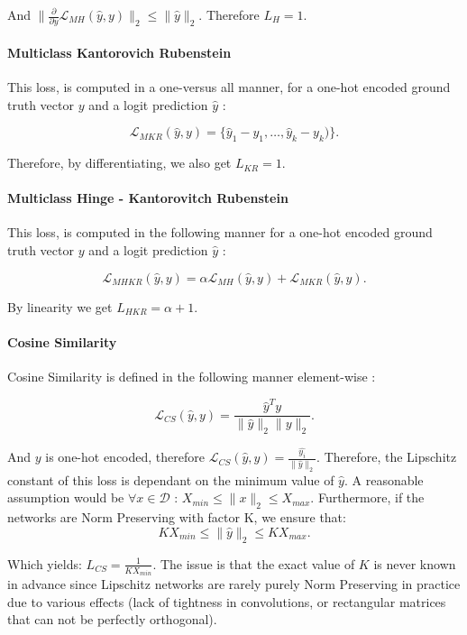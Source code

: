 \noindent And $\|\frac{\partial}{\partial y}\mathcal{L}_{MH} (\hat{y},y)\|_2 \leq \|\hat{y}\|_2$. Therefore $L_{H} = 1$.

\paragraph{Multiclass Kantorovich Rubenstein} This loss, is computed in a one-versus all manner, for a one-hot encoded ground truth vector $y$ and a logit prediction $\hat{y}$ :
 
 $$\mathcal{L}_{MKR} (\hat{y},y) = \{\hat{y}_1 - y_1 , \ldots , \hat{y}_k - y_k) \}.$$

\noindent Therefore, by differentiating, we also get $L_{KR} = 1$.

 \paragraph{Multiclass Hinge - Kantorovitch Rubenstein} This loss, is computed in the following manner for a one-hot encoded ground truth vector $y$ and a logit prediction $\hat{y}$ :

$$\mathcal{L}_{MHKR} (\hat{y},y) = \alpha\mathcal{L}_{MH} (\hat{y},y) + \mathcal{L}_{MKR} (\hat{y},y). $$

\noindent By linearity we get $L_{HKR} = \alpha + 1$.

\paragraph{Cosine Similarity} Cosine Similarity is defined in the following manner element-wise : 

$$\mathcal{L}_{CS} (\hat{y},y) = \frac{\hat{y}^Ty}{\|\hat{y}\|_2\|y\|_2}. $$

\noindent And $y$ is one-hot encoded, therefore $\mathcal{L}_{CS} (\hat{y},y) = \frac{\hat{y_i}}{\|\hat{y}\|_2}$. Therefore, the Lipschitz constant of this loss is dependant on the minimum value of $\hat{y}$. A reasonable assumption would be $\forall x \in \mathcal{D}$ :  $X_{min} \leq \|x\|_2 \leq X_{max}$. Furthermore, if the networks are Norm Preserving with factor K, we ensure that:
$$KX_{min} \leq \|\hat{y}\|_2 \leq KX_{max}.$$

\noindent Which yields: $L_{CS} = \frac{1}{KX_{min}}$. The issue is that the exact value of $K$ is never known in advance since Lipschitz networks are rarely purely Norm Preserving in practice due to various effects (lack of tightness in convolutions, or rectangular matrices that can not be perfectly orthogonal). 

